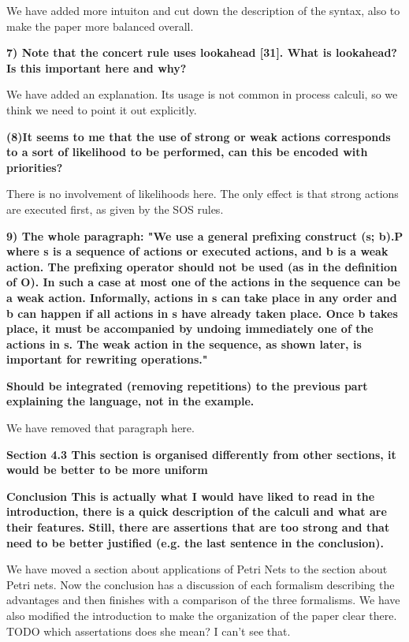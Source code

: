 \documentclass{article}
\begin{document}
We have added more intuiton and cut down the description of the syntax, also to make the paper more balanced overall.

\textbf{7) Note that the concert rule uses lookahead [31].
What is lookahead? Is this important here and why?}

We have added an explanation. Its usage is not common in process calculi, so we think we need to point it out explicitly.

\textbf{(8)It seems to me that the use of strong or weak actions corresponds to a sort of likelihood to be performed, can this be encoded with priorities?}

There is no involvement of likelihoods here. The only effect is that strong actions are executed first, as given by the SOS rules.

\textbf{9) The whole paragraph:
"We use a general prefixing construct (s; b).P where s is a sequence of actions or executed actions, and b is a weak action. The prefixing operator should not be used (as in the definition of O). In such a case at most one of the actions in the sequence can be a weak action. Informally, actions in s can take place in any order and b can happen if all actions in s have already taken place. Once b takes place, it must be accompanied by undoing immediately one of the actions in s. The weak action in the sequence, as shown later, is important for rewriting operations."}

\textbf{Should be integrated (removing repetitions) to the previous part explaining the language, not in the example.}

We have removed that paragraph here.

\textbf{Section 4.3
This section is organised differently from other sections, it would be better to be more uniform}

\textbf{Conclusion
This is actually what I would have liked to read in the introduction, there is a quick description of the calculi and what are their features.
Still, there are assertions that are too strong and that need to be better justified (e.g. the last sentence in the conclusion).}

We have moved a section about applications of Petri Nets to the section about Petri nets. Now the conclusion has a discussion of each formalism describing the advantages and then finishes with a comparison of the three formalisms. We have also modified the introduction to make the organization of the paper clear there.
TODO which assertations does she mean? I can't see that.
\end{document}
